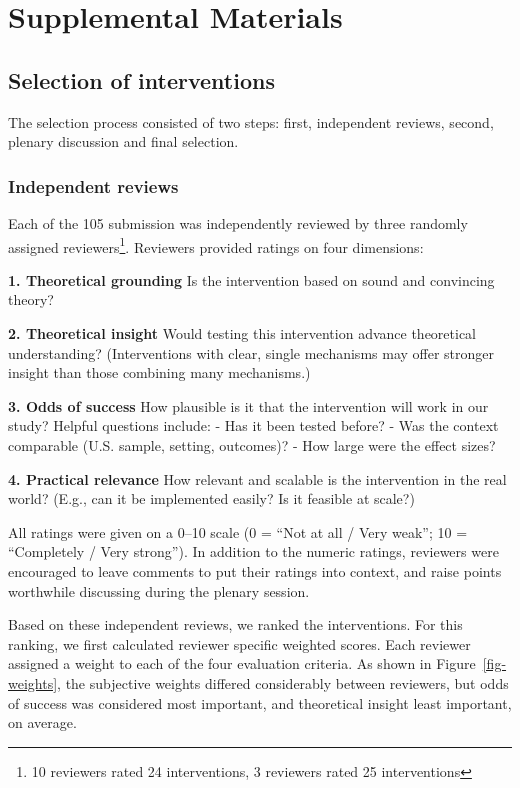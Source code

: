 \documentclass[
  letterpaper,
  DIV=11,
  numbers=noendperiod]{scrartcl}
\begin{document}
\clearpage

\section{Supplemental Materials}\label{supplemental-materials}

\subsection{Selection of interventions}\label{sec-selection}

The selection process consisted of two steps: first, independent
reviews, second, plenary discussion and final selection.

\subsubsection{Independent reviews}\label{independent-reviews}

Each of the 105 submission was independently reviewed by three randomly
assigned reviewers\footnote{10 reviewers rated 24 interventions, 3
  reviewers rated 25 interventions}. Reviewers provided ratings on four
dimensions:

\textbf{1. Theoretical grounding} Is the intervention based on sound and
convincing theory?

\textbf{2. Theoretical insight} Would testing this intervention advance
theoretical understanding? (Interventions with clear, single mechanisms
may offer stronger insight than those combining many mechanisms.)

\textbf{3. Odds of success} How plausible is it that the intervention
will work in our study? Helpful questions include: - Has it been tested
before? - Was the context comparable (U.S. sample, setting, outcomes)? -
How large were the effect sizes?

\textbf{4. Practical relevance} How relevant and scalable is the
intervention in the real world? (E.g., can it be implemented easily? Is
it feasible at scale?)

All ratings were given on a 0--10 scale (0 = ``Not at all / Very weak'';
10 = ``Completely / Very strong''). In addition to the numeric ratings,
reviewers were encouraged to leave comments to put their ratings into
context, and raise points worthwhile discussing during the plenary
session.

Based on these independent reviews, we ranked the interventions. For
this ranking, we first calculated reviewer specific weighted scores.
Each reviewer assigned a weight to each of the four evaluation criteria.
As shown in Figure~\ref{fig-weights}, the subjective weights differed
considerably between reviewers, but odds of success was considered most
important, and theoretical insight least important, on average.
\end{document}
